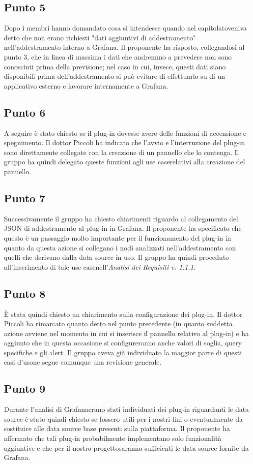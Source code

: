     \subsection{Punto 5}
        Dopo i membri hanno domandato cosa si intendesse quando nel capitolato\glosp veniva detto che non erano richiesti "dati aggiuntivi di addestramento" nell'addestramento interno a Grafana\glo. Il proponente ha risposto, collegandosi al punto 3, che in linea di massima i dati che andremmo a prevedere non sono conosciuti prima della previsione; nel caso in cui, invece, questi dati siano disponibili prima dell'addestramento si può evitare di effettuarlo su di un applicativo esterno e lavorare internamente a Grafana\glo.
    \subsection{Punto 6}
        A seguire è stato chiesto se il plug-in dovesse avere delle funzioni di accensione e spegnimento. Il dottor Piccoli ha indicato che l'avvio e l'interruzione del plug-in sono direttamente collegate con la creazione di un pannello che lo contenga. Il gruppo ha quindi delegato queste funzioni agli use case\glosp relativi alla creazione del pannello.
    \subsection{Punto 7}
        Successivamente il gruppo ha chiesto chiarimenti riguardo al collegamento del JSON di addestramento al plug-in in Grafana\glo. Il proponente ha specificato che questo è un passaggio molto importante per il funzionamento del plug-in in quanto da questa azione si collegano i nodi analizzati nell'addestramento con quelli che derivano dalla data source in uso. Il gruppo ha quindi proceduto all'inserimento di tale use case\glosp nell'\textit{Analisi dei Requisiti v. 1.1.1}.
    \subsection{Punto 8}
        È stata quindi chiesto un chiarimento sulla configurazione dei plug-in. Il dottor Piccoli ha rimarcato quanto detto nel punto precedente (in quanto suddetta azione avviene nel momento in cui si inserisce il pannello relativo al plug-in) e ha aggiunto che in questa occasione si configureranno anche valori di soglia, query specifiche e gli alert\glo. Il gruppo aveva già individuato la maggior parte di questi casi d'uso\glosp ne segue comunque una revisione generale.
    \subsection{Punto 9}
        Durante l'analisi di Grafana\glosp erano stati individuati dei plug-in riguardanti le data source è stato quindi chiesto se fossero utili per i nostri fini o eventualmente da sostituire alle data source base presenti sulla piattaforma. Il proponente ha affermato che tali plug-in probabilmente implementano solo funzionalità aggiuntive e che per il nostro progetto\glosp saranno sufficienti le data source fornite da Grafana\glo.
